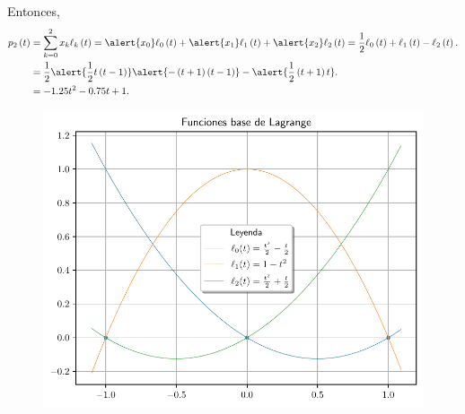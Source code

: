 \begin{frame}
\begin{solution}
		Entonces,
		\begin{align*}
			p_{2}\left(t\right) & =
			\sum\limits_{k=0}^{2}
			x_{k}
			\ell_{k}\left(t\right)=
			\alert{x_{0}}\ell_{0}\left(t\right)+
			\alert{x_{1}}\ell_{1}\left(t\right)+
			\alert{x_{2}}\ell_{2}\left(t\right)=
			\dfrac{1}{2}\ell_{0}\left(t\right)+
			\ell_{1}\left(t\right)-
			\ell_{2}\left(t\right).               \\
			                    & =
			\dfrac{1}{2}\alert{\dfrac{1}{2}t\left(t-1\right)}
			\alert{-\left(t+1\right)\left(t-1\right)}-
			\alert{\dfrac{1}{2}\left(t+1\right)t}. \\
			                    & =
			-1.25t^{2}-0.75t+1.
		\end{align*}
	\end{solution}
\end{frame}

\begin{frame}
	\begin{solution}
		\begin{figure}[ht!]
			\centering
			\includegraphics[width=.8\paperwidth]{p6_lagrange}
		\end{figure}
	\end{solution}
\end{frame}


